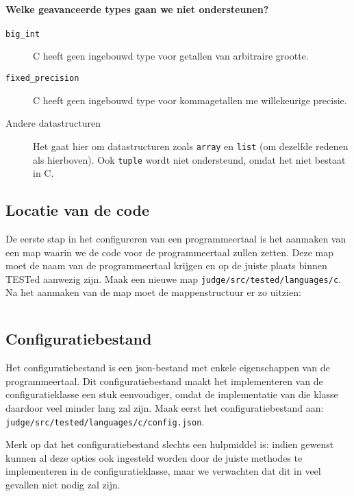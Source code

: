 \paragraph{Welke geavanceerde types gaan we niet ondersteunen?}

\begin{description}
    \item[\texttt{big\_int}] C heeft geen ingebouwd type voor getallen van arbitraire grootte.
    \item[\texttt{fixed\_precision}] C heeft geen ingebouwd type voor
    kommagetallen me willekeurige precisie.
    \item[Andere datastructuren] Het gaat hier om datastructuren zoals \texttt{array} en \texttt{list} (om dezelfde redenen als hierboven).
    Ook \texttt{tuple} wordt niet ondersteund, omdat het niet bestaat in C\@.
\end{description}

\subsection{Locatie van de code}\label{subsec:locatie-van-de-code}

De eerste stap in het configureren van een programmeertaal is het aanmaken van een map waarin we de code voor de programmeertaal zullen zetten.
Deze map moet de naam van de programmeertaal krijgen en op de juiste plaats binnen TESTed aanwezig zijn.
Maak een nieuwe map \texttt{judge/src/tested/languages/c}.
Na het aanmaken van de map moet de mappenstructuur er zo uitzien:

\inputminted{text}{code/dirs-c-code-location.txt}

\subsection{Configuratiebestand}\label{subsec:configuratiebestand}

Het configuratiebestand is een json-bestand met enkele eigenschappen van de programmeertaal.
Dit configuratiebestand maakt het implementeren van de configuratieklasse een stuk eenvoudiger, omdat de implementatie van die klasse daardoor veel minder lang zal zijn.
Maak eerst het configuratiebestand aan: \texttt{judge/src/tested/languages/c/config.json}.

Merk op dat het configuratiebestand slechts een hulpmiddel is: indien gewenst kunnen al deze opties ook ingesteld worden door de juiste methodes te implementeren in de configuratieklasse, maar we verwachten dat dit in veel gevallen niet nodig zal zijn.

